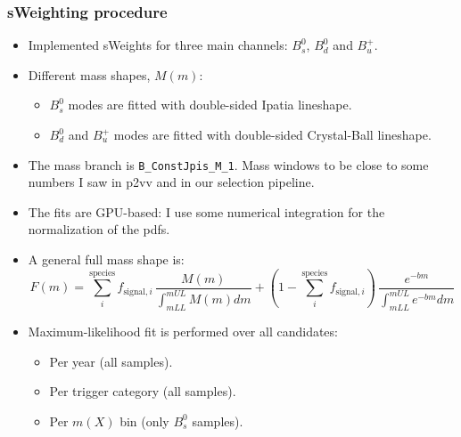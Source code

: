 \documentclass[9pt,aspectratio=43]{beamer}
\begin{document}
%
\begin{frame}[default]
\frametitle{sWeighting procedure}

\begin{itemize}
  \item Implemented sWeights for three main channels: $B_s^0$, $B_d^0$ and $B_u^+$.
  \item Different mass shapes, $M(m)$:
    \begin{itemize}
      \item $B_s^0$ modes are fitted with double-sided Ipatia lineshape.
      \item $B_d^0$ and $B_u^+$ modes are fitted with double-sided Crystal-Ball lineshape.
    \end{itemize}
  \item The mass branch is \texttt{B\_ConstJpis\_M\_1}. Mass windows to be
    close to some numbers I saw in p2vv and in our selection pipeline.
  \item The fits are GPU-based: I use some numerical integration for the normalization of the pdfs.
  \item A general full mass shape is:
    $$ F(m) = \sum_{i}^{\text{species}} f_{\text{signal}, i} \, \frac{M(m)}{\int_{mLL}^{mUL} M(m) dm} + \left( 1-\sum_{i}^{\text{species}}f_{\text{signal}, i} \right) \, \frac{e^{-bm}}{\int_{mLL}^{mUL} e^{-bm} dm} $$
  \item Maximum-likelihood fit is performed over all candidates:
    \begin{itemize}
      \item Per year (all samples).
      \item Per trigger category (all samples).
      \item Per $m(X)$ bin (only $B_s^0$ samples).
    \end{itemize}

\end{itemize}

\end{frame}
%
\end{document}
